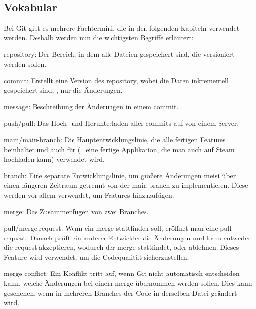 \renewcommand{\kapitelautor}{Autor: Felix Zwickelstorfer}
\subsection{Vokabular}\label{subsec:git-vokabular}


\renewcommand{\kapitelautor}{Autor: Felix Zwickelstorfer}

Bei Git gibt es mehrere Fachtermini, die in den folgenden Kapiteln verwendet werden.
Deshalb werden nun die wichtigsten Begriffe erläutert:

\begin{liste}
    \item repository: Der Bereich, in dem alle Dateien gespeichert sind, die versioniert werden sollen.
    \item commit: Erstellt eine Version des repository, wobei die Daten inkrementell gespeichert sind, \dah, nur die Änderungen.
    \item message: Beschreibung der Änderungen in einem commit.
    \item push/pull: Das Hoch- und Herunterladen aller commits auf \bzw von einem Server.
    \item main/main-branch: Die Hauptentwicklungslinie, die alle fertigen Features beinhaltet und auch für  (=eine fertige Applikation, die man auch auf Steam hochladen kann) verwendet wird.
    \item branch: Eine separate Entwicklungslinie, um größere Änderungen meist über einen längeren Zeitraum getrennt von der main-branch zu implementieren.
    Diese werden vor allem verwendet, um Features hinzuzufügen.
    \item merge: Das Zusammenfügen von zwei Branches.
    \item pull/merge request: Wenn ein merge stattfinden soll, eröffnet man eine pull request.
    Danach prüft ein anderer Entwickler die Änderungen und kann entweder die request akzeptieren, wodurch der merge stattfindet, oder ablehnen.
    Dieses Feature wird verwendet, um die Codequalität sicherzustellen.
    \item merge conflict: Ein Konflikt tritt auf, wenn Git nicht automatisch entscheiden kann, welche Änderungen bei einem merge übernommen werden sollen.
    Dies kann geschehen, wenn in mehreren Branches der Code in derselben Datei geändert wird.
\end{liste}

\vfill
\pagebreak
